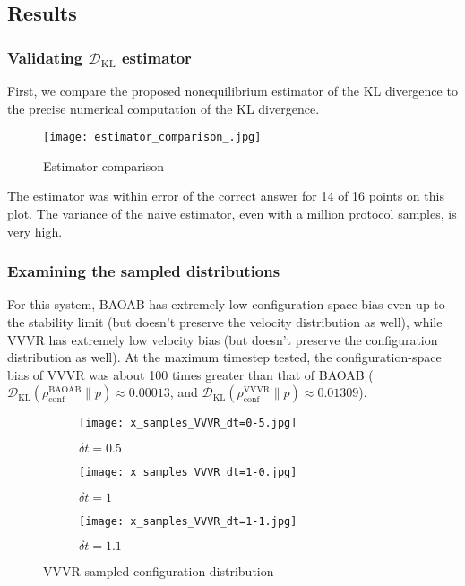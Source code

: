 \documentclass[11pt]{article}
\newcommand{\kldiv}{\mathcal{D}_\text{KL}}
\newcommand{\conf}{\rho_\text{conf}}
\begin{document}
\subsection{Results}

\subsubsection{Validating $\kldiv$ estimator}
First, we compare the proposed nonequilibrium estimator of the KL divergence to the precise numerical computation of the KL divergence.

\begin{figure}[h]
	\centering
	\texttt{[image: estimator\_comparison\_.jpg]}
	\caption{Estimator comparison}
\end{figure}

The estimator was within error of the correct answer for 14 of 16 points on this plot.
The variance of the naive estimator, even with a million protocol samples, is very high.

\subsubsection{Examining the sampled distributions}
For this system, BAOAB has extremely low configuration-space bias even up to the stability limit (but doesn't preserve the velocity distribution as well), while VVVR has extremely low velocity bias (but doesn't preserve the configuration distribution as well).
At the maximum timestep tested, the configuration-space bias of VVVR was about 100 times greater than that of BAOAB ($\kldiv(\conf^\text{BAOAB} \| p) \approx 0.00013$, and $\kldiv(\conf^\text{VVVR} \| p) \approx 0.01309$).

\begin{figure}[H] %
    \centering
    \begin{subfigure}[b]{0.3\textwidth}
        \texttt{[image: x\_samples\_VVVR\_dt=0-5.jpg]}
        \caption{$\delta t = 0.5$}
    \end{subfigure}
    \begin{subfigure}[b]{0.3\textwidth}
        \texttt{[image: x\_samples\_VVVR\_dt=1-0.jpg]}
        \caption{$\delta t = 1$}
    \end{subfigure}
    \begin{subfigure}[b]{0.3\textwidth}
        \texttt{[image: x\_samples\_VVVR\_dt=1-1.jpg]}
        \caption{$\delta t = 1.1$}
    \end{subfigure}
    \caption{VVVR sampled configuration distribution}
\end{figure}
\end{document}
